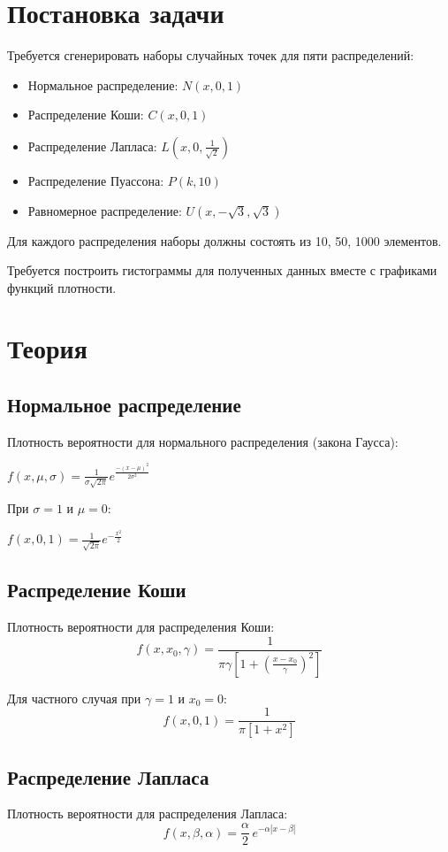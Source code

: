 \section{Постановка задачи}
Требуется сгенерировать наборы случайных точек для пяти распределений:
\begin{itemize}
\item Нормальное распределение: $N(x, 0, 1)$
\item Распределение Коши: $C(x, 0, 1)$
\item Распределение Лапласа: $L(x, 0, \frac{1}{\sqrt{2}})$
\item Распределение Пуассона: $P(k, 10)$
\item Равномерное распределение: $U(x, -\sqrt{3}, \sqrt{3})$
\end{itemize}
Для каждого распределения наборы должны состоять из 10, 50, 1000 элементов. 

Требуется построить гистограммы для полученных данных вместе с графиками функций плотности.


\section{Теория}
\subsection{Нормальное распределение}
Плотность вероятности для нормального распределения (закона Гаусса):

$
  f(x, \mu, \sigma) = \frac{1}{{\sigma \sqrt {2\pi } }}e^\frac{ - \left( {x - \mu } \right)^2 } {2\sigma ^2 }
$
 
При \( \sigma = 1 \) и \( \mu = 0 \):

$
  f(x, 0, 1) = \frac{1}{ \sqrt {2\pi } }e^{-\frac{{x}^2 }{2}}
$


\subsection{Распределение Коши}
Плотность вероятности для распределения Коши:
$$
f(x, {x_0}, \gamma) =  \frac{1}{\pi\gamma \left[1 + \left(\frac{x-x_0}{\gamma}\right)^2\right]}
$$

Для частного случая при \( \gamma = 1 \) и \( x_0 = 0 \):
$$
f(x, 0, 1) =  \frac{1}{\pi \left[1 + {x}^2\right]}
$$


\subsection{Распределение Лапласа}
Плотность вероятности для распределения Лапласа:
\begin{equation} 
f(x, \beta, \alpha) = \frac{\alpha}{2} \, e^{-\alpha|x - \beta|}
\end{equation}

